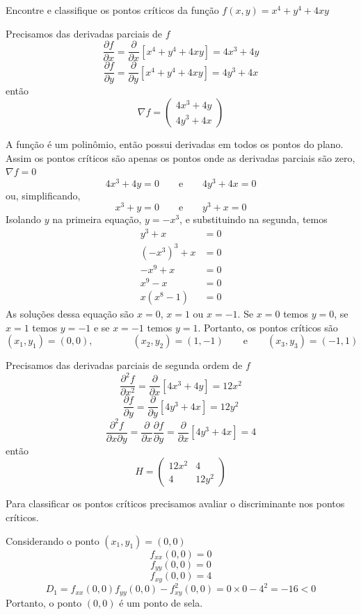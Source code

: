 \documentclass[a4paper,12pt,fleqn]{article}
\newcommand{\D}[2]{\frac{\partial {#1}}{\partial {#2}}}
\newcommand{\DS}[2]{\frac{\partial^2 {#1}}{\partial {#2}^2}}
\newcommand{\DM}[3]{\frac{\partial^2 {#1}}{\partial {#2} \partial {#3}}}
\newcommand{\vetor}[2]{\left(\begin{array}{c} #1 \\ #2 \end{array}\right)}
\begin{document}
Encontre e classifique os pontos críticos da função
\(
  f(x, y) = x^4 + y^4 + 4xy
\)

\begin{answer}
  Precisamos das derivadas parciais de $f$
  \[
    \D{f}{x}
    = \D{}{x}\left[x^4 + y^4 + 4xy\right]
    = 4x^3 + 4y
  \]
  \[
    \D{f}{y}
    = \D{}{y}\left[x^4 + y^4 + 4xy\right]
    = 4y^3 + 4x
  \]
  então
  \[
    \nabla f = \vetor{4x^3 + 4y}{4y^3 + 4x}
  \]

  A função é um polinômio, então possui derivadas em todos os pontos do plano.
  Assim os pontos críticos são apenas os pontos onde as derivadas parciais são zero,
  \(\nabla f = 0\)
  \[
    4x^3 + 4y = 0
    \qquad\text{e}\qquad
    4y^3 + 4x = 0
  \]
  ou, simplificando,
  \[
    x^3 + y = 0
    \qquad\text{e}\qquad
    y^3 + x = 0
  \]
  Isolando $y$ na primeira equação, \(y = -x^3\), e substituindo na segunda, temos
  \begin{align*}
    y^3 + x                 & = 0 \\
    \left(-x^3\right)^3 + x & = 0 \\
    -x^9 + x                & = 0 \\
    x^9 - x                 & = 0 \\
    x(x^8 - 1)              & = 0
  \end{align*}
  As soluções dessa equação são $x=0$, $x=1$ ou $x=-1$.
  Se $x=0$ temos $y=0$,
  se $x=1$ temos $y=-1$ e
  se $x=-1$ temos $y=1$.
  Portanto, os pontos críticos são
  \[
    (x_1, y_1) = (0, 0),
    \qquad\qquad
    (x_2, y_2) = (1, -1)
    \qquad\text{e}\qquad
    (x_3, y_3) = (-1, 1)
  \]

  Precisamos das derivadas parciais de segunda ordem de $f$
  \[
    \DS{f}{x}
    = \D{}{x}\left[4x^3 + 4y\right]
    = 12x^2
  \]
  \[
    \D{f}{y}
    = \D{}{y}\left[4y^3 + 4x\right]
    = 12y^2
  \]
  \[
    \DM{f}{x}{y}
    = \D{}{x}\D{f}{y}
    = \D{}{x}\left[4y^3 + 4x\right]
    = 4
  \]
  então
  \[
    H = \left(\begin{array}{cc}
      12x^2 & 4 \\
      4 & 12y^2
    \end{array}\right)
  \]


  Para classificar os pontos críticos precisamos avaliar o discriminante nos
  pontos críticos.

  Considerando o ponto \((x_1, y_1) = (0, 0)\)
  \[
    f_{xx}(0, 0) = 0
  \]
  \[
    f_{yy}(0, 0) = 0
  \]
  \[
    f_{xy}(0, 0) = 4
  \]
  \[
    D_1
    = f_{xx}(0, 0)f_{yy}(0, 0) - f^2_{xy}(0, 0)
    = 0 \times 0 - 4^2
    = -16 < 0
  \]
  Portanto, o ponto $(0, 0)$ é um ponto de sela.


\end{answer}
\end{document}
